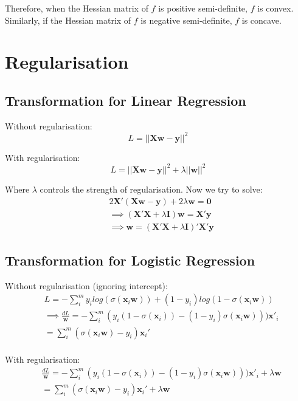 \documentclass{article}
\newcommand{\V}[1]{\boldsymbol{#1}}
\begin{document}
Therefore, when the Hessian matrix of \(f\) is positive semi-definite, \(f\) is
convex. Similarly, if the Hessian matrix of \(f\) is negative semi-definite,
\(f\) is concave.

\section{Regularisation}
\subsection{Transformation for Linear Regression}
Without regularisation:
\begin{equation}
L=||\mathbf{X}\V{w}-\V{y}||^2
\end{equation}

With regularisation:
\begin{equation}
L=||\mathbf{X}\V{w}-\V{y}||^2+\lambda||\V{w}||^2
\end{equation}

Where \(\lambda\) controls the strength of regularisation. Now we try to solve:
\begin{equation}
\begin{aligned}
&2\mathbf{X}'(\mathbf{X}\V{w}-\V{y})+2\lambda \V{w}=\V{0}\\
&\implies (\mathbf{X}'\mathbf{X}+\lambda \mathbf{I})\V{w}=\mathbf{X}'\V{y}\\
&\implies \V{w}=(\mathbf{X}'\mathbf{X}+\lambda \mathbf{I})'\mathbf{X}'\V{y}
\end{aligned}
\end{equation}

\subsection{Transformation for Logistic Regression}

Without regularisation (ignoring intercept):
\begin{equation}
\begin{aligned}
&L=-\sum_{i}^my_ilog(\sigma(\V{x}_i\V{w}))+(1-y_i)log(1-\sigma(\V{x}_i\V{w}))\\
&\implies
\frac{dL}{\V{w}}=-\sum_{i}^m(y_i(1-\sigma(\V{x}_i))-(1-y_i)\sigma(\V{x}_i\V{w})))\V{x}'_i\\
&=\sum_{i}^m(\sigma(\V{x}_i\V{w})-y_i)\V{x}_i'\\
\end{aligned}
\end{equation}

With regularisation:
\begin{equation}
\begin{aligned}
&\frac{dL}{\V{w}}=-\sum_{i}^m(y_i(1-\sigma(\V{x}_i))-(1-y_i)\sigma(\V{x}_i\V{w})))\V{x}'_i+\lambda\V{w}\\
&=\sum_{i}^m(\sigma(\V{x}_i\V{w})-y_i)\V{x}_i'+\lambda\V{w}\\
\end{aligned}
\end{equation}
\end{document}

